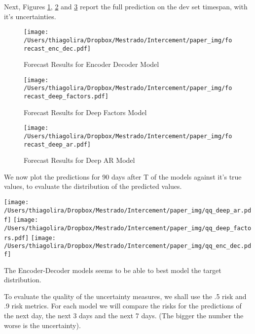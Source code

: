 \documentclass[a4paper]{article}
\begin{document}
Next, Figures \ref{fig:orgbc84a58}, \ref{fig:org32bded3} and \ref{fig:org484f42d} report the full prediction on the dev set timespan, with it's uncertainties.

\begin{figure}[H]
\centering
\texttt{[image: /Users/thiagolira/Dropbox/Mestrado/Intercement/paper\_img/forecast\_enc\_dec.pdf]}
\caption{\label{fig:orgbc84a58}
Forecast Results for Encoder Decoder Model}
\end{figure} 

\begin{figure}[H]
\centering
\texttt{[image: /Users/thiagolira/Dropbox/Mestrado/Intercement/paper\_img/forecast\_deep\_factors.pdf]}
\caption{\label{fig:org32bded3}
Forecast Results for Deep Factors Model}
\end{figure} 

\begin{figure}[htbp]
\centering
\texttt{[image: /Users/thiagolira/Dropbox/Mestrado/Intercement/paper\_img/forecast\_deep\_ar.pdf]}
\caption{\label{fig:org484f42d}
Forecast Results for Deep AR Model}
\end{figure} 

We now plot the predictions for 90 days after T of the models against it's true values, to evaluate the distribution of the predicted values.

\begin{center}
\texttt{[image: /Users/thiagolira/Dropbox/Mestrado/Intercement/paper\_img/qq\_deep\_ar.pdf]} 
\texttt{[image: /Users/thiagolira/Dropbox/Mestrado/Intercement/paper\_img/qq\_deep\_factors.pdf]} 
\texttt{[image: /Users/thiagolira/Dropbox/Mestrado/Intercement/paper\_img/qq\_enc\_dec.pdf]} 
\end{center}

The Encoder-Decoder models seems to be able to best model the target distribution.

To evaluate the quality of the uncertainty measures, we shall use the .5 risk and .9 risk metrics. For each model 
we will compare the risks for the predictions of the next day, the next 3 days and the next 7 days. (The bigger the number the worse is the uncertainty).
\end{document}
